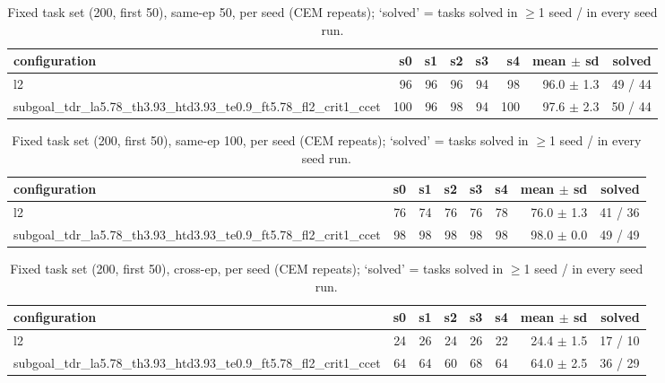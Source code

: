\begin{table}[H]
\centering\small
\caption{Fixed task set (200, first 50), same-ep 50, per seed (CEM repeats); `solved' = tasks solved in $\ge$1 seed / in every seed run.}
\label{tab:gas-mpc-pooled-same50-task200-n50}
\begin{tabular}{lrrrrrrr}
\toprule
configuration & s0 & s1 & s2 & s3 & s4 & mean $\pm$ sd & solved \\
\midrule
l2 & 96 & 96 & 96 & 94 & 98 & 96.0 $\pm$ 1.3 & 49 / 44 \\
subgoal\_tdr\_la5.78\_th3.93\_htd3.93\_te0.9\_ft5.78\_fl2\_crit1\_ccet & 100 & 96 & 98 & 94 & 100 & 97.6 $\pm$ 2.3 & 50 / 44 \\
\bottomrule
\end{tabular}
\end{table}

\begin{table}[H]
\centering\small
\caption{Fixed task set (200, first 50), same-ep 100, per seed (CEM repeats); `solved' = tasks solved in $\ge$1 seed / in every seed run.}
\label{tab:gas-mpc-pooled-same100-task200-n50}
\begin{tabular}{lrrrrrrr}
\toprule
configuration & s0 & s1 & s2 & s3 & s4 & mean $\pm$ sd & solved \\
\midrule
l2 & 76 & 74 & 76 & 76 & 78 & 76.0 $\pm$ 1.3 & 41 / 36 \\
subgoal\_tdr\_la5.78\_th3.93\_htd3.93\_te0.9\_ft5.78\_fl2\_crit1\_ccet & 98 & 98 & 98 & 98 & 98 & 98.0 $\pm$ 0.0 & 49 / 49 \\
\bottomrule
\end{tabular}
\end{table}

\begin{table}[H]
\centering\small
\caption{Fixed task set (200, first 50), cross-ep, per seed (CEM repeats); `solved' = tasks solved in $\ge$1 seed / in every seed run.}
\label{tab:gas-mpc-pooled-cross-task200-n50}
\begin{tabular}{lrrrrrrr}
\toprule
configuration & s0 & s1 & s2 & s3 & s4 & mean $\pm$ sd & solved \\
\midrule
l2 & 24 & 26 & 24 & 26 & 22 & 24.4 $\pm$ 1.5 & 17 / 10 \\
subgoal\_tdr\_la5.78\_th3.93\_htd3.93\_te0.9\_ft5.78\_fl2\_crit1\_ccet & 64 & 64 & 60 & 68 & 64 & 64.0 $\pm$ 2.5 & 36 / 29 \\
\bottomrule
\end{tabular}
\end{table}
